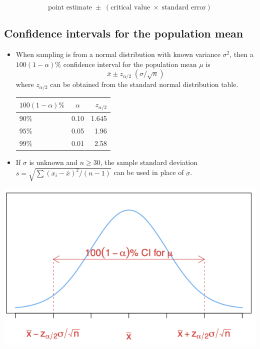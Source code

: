 \documentclass[
]{article}
\begin{document}
\[\text{point estimate}\; \pm \; (\text{critical value}\; \times\; \text{standard error})\]

\hypertarget{confidence-intervals-for-the-population-mean}{%
\subsection{Confidence intervals for the population
mean}\label{confidence-intervals-for-the-population-mean}}

\begin{itemize}
\item
  When sampling is from a normal distribution with known variance
  \(\sigma^2\), then a \(100(1-\alpha)\%\) confidence interval for the
  population mean \(\mu\) is
  \[ \bar{x}\pm z_{\alpha/2} \; (\sigma/\sqrt{n} )\] where
  \(z_{\alpha/2}\) can be obtained from the standard normal distribution
  table.

  \begin{longtable}[]{@{}lcr@{}}
  \toprule()
  \(100(1-\alpha)\%\) & \(\alpha\) & \(z_{\alpha/2}\) \\
  \midrule()
  \endhead
  \(90\%\) & 0.10 & 1.645 \\
  \(95\%\) & 0.05 & 1.96 \\
  \(99\%\) & 0.01 & 2.58 \\
  \bottomrule()
  \end{longtable}
\item
  If \(\sigma\) is unknown and \(n \geq 30\), the sample standard
  deviation \(s=\sqrt{\sum(x_i-\bar{x})^2/(n-1)}\) can be used in place
  of \(\sigma\).
\end{itemize}

\begin{center}\includegraphics[width=1\linewidth,height=1\textheight]{estimationmean} \end{center}
\end{document}
